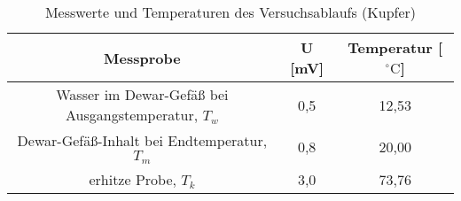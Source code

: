 \begin{table}[h]
	\begin{center}
		\begin{tabular}{ccc}
			Messprobe & U [mV] & Temperatur [$^{\circ}\mathrm{C}$]\\ \hline
			Wasser im Dewar-Gefäß bei Ausgangstemperatur, $T_w$& 0,5 & 12,53\\
			Dewar-Gefäß-Inhalt bei Endtemperatur, $T_m$&0,8&20,00\\
			erhitze Probe, $T_k$&3,0&73,76
		\end{tabular}
		\caption{Messwerte und Temperaturen des Versuchsablaufs (Kupfer)}
		\label{tabkupfer1}
	\end{center}
\end{table}